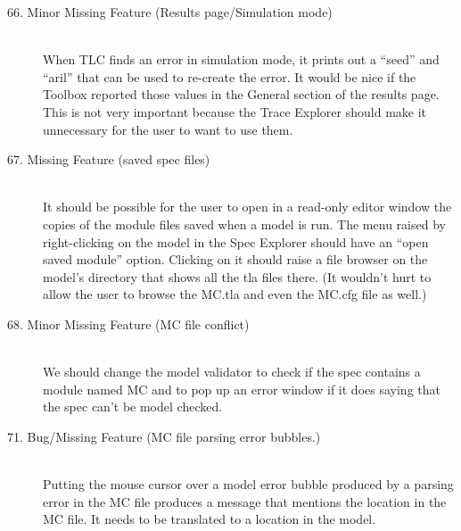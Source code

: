 \documentclass{article}
\begin{document}
\begin{description}
\item[66. Minor Missing Feature (Results page/Simulation mode)] \mbox{}\\
%
When TLC finds an error in simulation mode, it prints out a ``seed'' and
``aril'' that can be used to re-create the error.  It would be nice if
the Toolbox reported those values in the General section of the
results page.  This is not very important because the Trace Explorer
should make it unnecessary for the user to want to use them.

\item[67. Missing Feature (saved spec files)] \mbox{}\\
%
It should be possible for the user to open in a read-only editor
window the copies of the module files saved when a model is run.  The
menu raised by right-clicking on the model in the Spec Explorer should
have an ``open saved module'' option.  Clicking on it should raise a
file browser on the model's directory that shows all the tla files
there.  (It wouldn't hurt to allow the user to browse the MC.tla and
even the MC.cfg file as well.)

\item[68. Minor Missing Feature (MC file conflict)] \mbox{}\\
%
We should change the model validator to check if the spec contains a
module named MC and to pop up an error window if it does saying that
the spec can't be model checked.
  


\item[71. Bug/Missing Feature (MC file parsing error bubbles.)] \mbox{}\\
Putting the mouse cursor over a model error bubble produced by a 
parsing error in the MC file produces a message that mentions
the location in the MC file.  It needs to be translated to
a location in the model.


\end{description}
\end{document}

